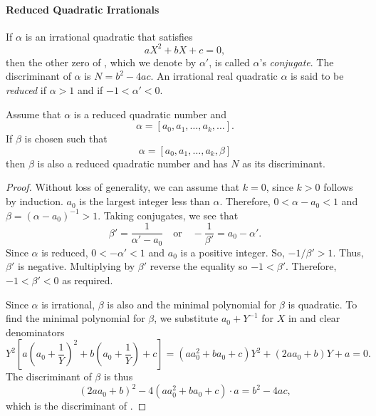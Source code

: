 \paragraph{Reduced Quadratic Irrationals}

If $\alpha$ is an irrational quadratic that satisfies
\begin{equation}\label{CF:Conjugate:Eq}
aX^2 + b X + c = 0,
\end{equation}
then the other zero of , which we denote by
$\alpha'$, is called $\alpha$'s {\em conjugate}.  The discriminant of $\alpha$ is $N = b^2 - 4ac$.  An
irrational real quadratic $\alpha$ is said to be {\em reduced} if
$\alpha > 1$ and if $-1 < \alpha' < 0$.

\begin{proposition}
Assume that $\alpha$ is a reduced quadratic number and
\[
\alpha =  [a_0, a_1, \ldots, a_k, \ldots].
\]
If $\beta$ is chosen such that
\[
\alpha = [a_0, a_1, \ldots, a_k, \beta]
\]
then $\beta$ is also a reduced quadratic number and has $N$ as its
discriminant. 
\end{proposition}

\begin{proof}

Without loss of generality, we can assume that $k = 0$, since $k> 0$
follows by induction.  $a_0$ is the largest integer less than
$\alpha$.  Therefore, $0 < \alpha - a_0 < 1$ and $\beta = (\alpha -
a_0)^{-1} > 1$.  Taking conjugates, we see that
\[
\beta' = \frac{1}{\alpha' - a_0}
\quad
\mbox{or}
\quad
-\frac{1}{\beta'} = a_0 - \alpha'.
\]
Since $\alpha$ is reduced, $0 < - \alpha' < 1$ and $a_0$ is a positive
integer.  So, $-1/\beta' > 1$.  Thus, $\beta'$ is negative.
Multiplying by $\beta'$ reverse the equality so $-1 < \beta'$.
Therefore, $-1 < \beta' < 0$ as required.

Since $\alpha$ is irrational, $\beta$ is also and the minimal
polynomial for $\beta$ is quadratic.  To find the minimal polynomial
for $\beta$, we substitute $a_0 + Y^{-1}$ for $X$ in
 and clear denominators
\[
Y^2 \left[ a \left(a_0 + \frac{1}{Y}\right)^2 + b \left(a_0 +
\frac{1}{Y} \right) + c \right] =
(a a_0^2 + b a_0 + c) Y^2 + (2a a_0 + b)Y + a = 0.
\]
The discriminant of $\beta$ is thus
\[
(2a a_0 + b)^2 - 4 (a a_0^2 + b a_0 + c) \cdot a = b^2 - 4 a c,
\]
which is the discriminant of .
\end{proof}

